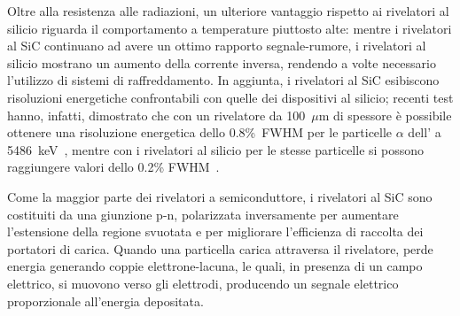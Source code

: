 Oltre alla resistenza alle radiazioni, un ulteriore vantaggio rispetto ai rivelatori al silicio riguarda il comportamento a temperature piuttosto alte: mentre i rivelatori al SiC continuano ad avere un ottimo rapporto segnale-rumore, i rivelatori al silicio mostrano un aumento della corrente inversa, rendendo a volte necessario l'utilizzo di sistemi di raffreddamento.
In aggiunta, i rivelatori al SiC esibiscono risoluzioni energetiche confrontabili con quelle dei dispositivi al silicio; recenti test hanno, infatti, dimostrato che con un rivelatore da 100~$\mu$m di spessore è possibile ottenere una risoluzione energetica dello 0.8\%~FWHM per le particelle $\alpha$ dell' a 5486~keV~\cite{tudisco:sensors18}, mentre con i rivelatori al silicio per le stesse particelle si possono raggiungere valori dello 0.2\% FWHM~\cite{steinbauer:nimb94}.


Come la maggior parte dei rivelatori a semiconduttore, i rivelatori al SiC sono costituiti da una giunzione p-n, polarizzata inversamente per aumentare l'estensione della regione svuotata e per migliorare l'efficienza di raccolta dei portatori di carica.
Quando una particella carica attraversa il rivelatore, perde energia generando coppie elettrone-lacuna, le quali, in presenza di un campo elettrico, si muovono verso gli elettrodi, producendo un segnale elettrico proporzionale all'energia depositata.


